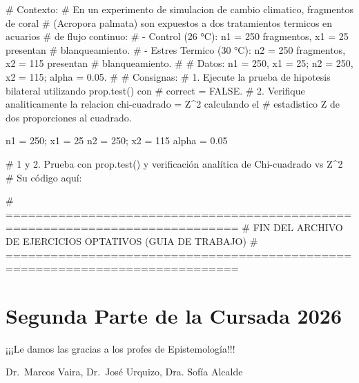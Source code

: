\documentclass[
  spanish,
  letterpaper,
  DIV=11,
  numbers=noendperiod]{scrreprt}
\newenvironment{Shaded}{\begin{snugshade}}{\end{snugshade}}
\newcommand{\CommentTok}[1]{\textcolor[rgb]{0.37,0.37,0.37}{#1}}
\newcommand{\DecValTok}[1]{\textcolor[rgb]{0.68,0.00,0.00}{#1}}
\newcommand{\FloatTok}[1]{\textcolor[rgb]{0.68,0.00,0.00}{#1}}
\newcommand{\NormalTok}[1]{\textcolor[rgb]{0.00,0.23,0.31}{#1}}
\newcommand{\OtherTok}[1]{\textcolor[rgb]{0.00,0.23,0.31}{#1}}
\begin{document}
\begin{Shaded}
\begin{Highlighting}[]
\CommentTok{\# Contexto:}
\CommentTok{\# En un experimento de simulacion de cambio climatico, fragmentos de coral}
\CommentTok{\# (Acropora palmata) son expuestos a dos tratamientos termicos en acuarios}
\CommentTok{\# de flujo continuo:}
\CommentTok{\#   {-} Control (26 °C): n1 = 250 fragmentos, x1 = 25 presentan}
\CommentTok{\#     blanqueamiento.}
\CommentTok{\#   {-} Estres Termico (30 °C): n2 = 250 fragmentos, x2 = 115 presentan}
\CommentTok{\#     blanqueamiento.}
\CommentTok{\#}
\CommentTok{\# Datos: n1 = 250, x1 = 25; n2 = 250, x2 = 115; alpha = 0.05.}
\CommentTok{\#}
\CommentTok{\# Consignas:}
\CommentTok{\# 1. Ejecute la prueba de hipotesis bilateral utilizando prop.test() con}
\CommentTok{\#    correct = FALSE.}
\CommentTok{\# 2. Verifique analiticamente la relacion chi{-}cuadrado = Z\^{}2 calculando el}
\CommentTok{\#    estadistico Z de dos proporciones al cuadrado.}

\NormalTok{n1 }\OtherTok{=} \DecValTok{250}\NormalTok{; x1 }\OtherTok{=} \DecValTok{25}
\NormalTok{n2 }\OtherTok{=} \DecValTok{250}\NormalTok{; x2 }\OtherTok{=} \DecValTok{115}
\NormalTok{alpha }\OtherTok{=} \FloatTok{0.05}

\CommentTok{\# 1 y 2. Prueba con prop.test() y verificación analítica de Chi{-}cuadrado vs Z\^{}2}
\CommentTok{\# Su código aquí:}



\CommentTok{\# =============================================================================}
\CommentTok{\# FIN DEL ARCHIVO DE EJERCICIOS OPTATIVOS (GUIA DE TRABAJO)}
\CommentTok{\# =============================================================================}
\end{Highlighting}
\end{Shaded}


\chapter*{Segunda Parte de la Cursada \textbar{}
2026}\label{segunda-parte-de-la-cursada-2026}


¡¡¡Le damos las gracias a los profes de Epistemología!!!

Dr.~Marcos Vaira, Dr.~José Urquizo, Dra. Sofía Alcalde
\end{document}
